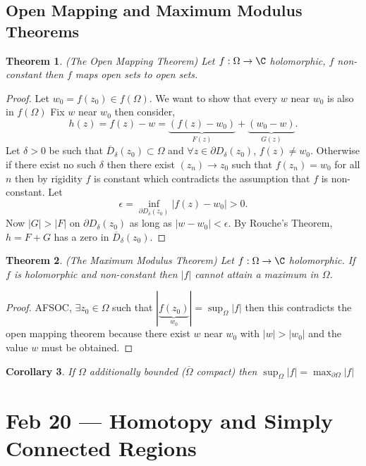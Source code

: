 \documentclass[a4paper]{article}
\newtheorem{thm}{Theorem}[section]
\newtheorem{cor}[thm]{Corollary}
\begin{document}
\subsection{Open Mapping and Maximum Modulus Theorems}
\begin{thm}
    (The Open Mapping Theorem) Let $f:\Omega\to \C$ holomorphic, $f$ non-constant then $f$ maps open sets to open sets. 
\end{thm}
\begin{proof}
    Let $w_0=f(z_0)\in f(\Omega)$. We want to show that every $w$ near $w_0$ is also in $f(\Omega)$
    Fix $w$ near $w_0$ then consider, \[
        h(z)=f(z)-w=\underbrace{(f(z)-w_0)}_{F(z)}+\underbrace{(w_0-w)}_{G(z)}
    .\] 
    Let $\delta>0$ be such that $\overline{D}_\delta(z_0)\subset \Omega$ and $\forall z\in \partial D_\delta(z_0)$, $f(z)\neq w_0$. Otherwise if there exist no such $\delta$ then there exist $(z_n)\to z_0$ such that $f(z_n)=w_0$ for all $n$ then by rigidity $f$ is constant which contradicts the assumption that $f$ is non-constant.
    Let \[
        \epsilon=\inf_{\partial D_\delta(z_0)}|f(z)-w_0|>0
    .\]
    Now $|G|>|F|$ on $\partial D_\delta(z_0)$ as long as $|w-w_0|<\epsilon$. By Rouche's Theorem, $h=F+G$ has a zero in $\overline{D}_\delta(z_0)$. 
\end{proof}
\begin{thm}
    (The Maximum Modulus Theorem) Let $f:\Omega\to \C$ holomorphic. If $f$ is holomorphic and non-constant then $|f|$ cannot attain a maximum in $\Omega$. 
\end{thm}
\begin{proof}
    AFSOC, $\exists z_0\in \Omega$ such that $|\underbrace{f(z_0)}_{w_0}|=\sup_{\Omega}|f|$ then this contradicts the open mapping theorem because there exist $w$ near $w_0$ with $|w|>|w_0|$ and the value $w$ must be obtained. 
\end{proof}
\begin{cor}
    If $\Omega$ additionally bounded ($\overline{\Omega}$ compact) then $\sup_\Omega |f|=\max_{\partial \Omega}|f|$ 
\end{cor}
\newpage
\section{Feb 20 --- Homotopy and Simply Connected Regions}
\end{document}
